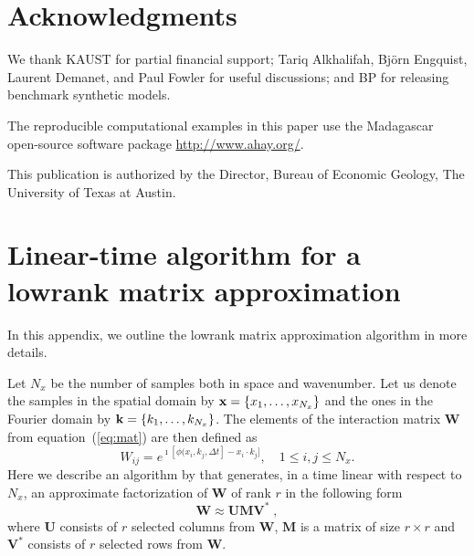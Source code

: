 \section{Acknowledgments}

We thank KAUST for partial financial support; Tariq Alkhalifah,
Bj\"{o}rn Engquist, Laurent Demanet, and Paul Fowler for useful
discussions; and BP for releasing benchmark synthetic models.

The reproducible computational examples in this paper use the
Madagascar open-source software package \url{http://www.ahay.org/}.

This publication is authorized by the Director, Bureau of Economic
Geology, The University of Texas at Austin.

\appendix
\section{Linear-time algorithm for a lowrank matrix approximation}
\label{sec:lowrank}

In this appendix, we outline the lowrank matrix approximation
algorithm in more details.

Let $N_x$ be the number of samples both in space and wavenumber. Let
us denote the samples in the spatial domain by
$\mathbf{x}=\{x_1,\ldots,x_{N_x}\}$ and the ones in the Fourier domain by
$\mathbf{k}=\{k_1,\ldots,k_{N_x}\}$. The elements of the interaction matrix
$\mathbf{W}$ from equation~(\ref{eq:mat}) are then defined as
\begin{equation}
W_{ij} = e^{\imath [\phi(x_i,k_j,\Delta t] - x_i \cdot k_j]},\quad
1\le i,j\le N_x.
\label{eq:wij}
\end{equation}
Here we describe an algorithm by \cite{engquistying2009} that
generates, in a time linear with respect to $N_x$, an approximate
factorization of $\mathbf{W}$ of rank $r$ in the following form
\begin{equation}
\mathbf{W} \approx \mathbf{U M V^*}\;,
\label{eq:umv}
\end{equation}
where $\mathbf{U}$ consists of $r$ selected columns from $\mathbf{W}$,
$\mathbf{M}$ is a matrix of size $r\times r$ and $\mathbf{V^*}$ consists of $r$
selected rows from $\mathbf{W}$.

